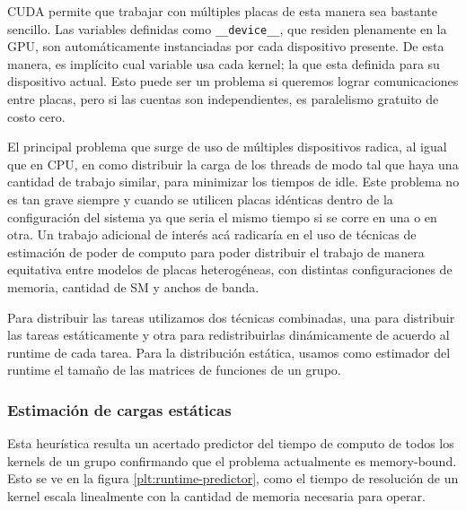 CUDA permite que trabajar con m\'ultiples placas de esta manera sea bastante sencillo. Las variables
definidas como \texttt{\_\_device\_\_}, que residen plenamente en la GPU, son autom\'aticamente instanciadas
por cada dispositivo presente. De esta manera, es impl\'icito cual variable usa cada kernel; la que
esta definida para su dispositivo actual. Esto puede ser un problema si queremos lograr comunicaciones entre placas,
pero si las cuentas son independientes, es paralelismo gratuito de costo cero.

El principal problema que surge de uso de m\'ultiples dispositivos radica, al igual que en
CPU, en como distribuir la carga de los threads de modo tal que haya una cantidad de trabajo
similar, para minimizar los tiempos de idle. Este problema no es tan grave siempre y cuando
se utilicen placas id\'enticas dentro de la configuraci\'on del sistema ya que seria
el mismo tiempo si se corre en una o en otra. Un trabajo adicional de inter\'es ac\'a
radicar\'ia en el uso de t\'ecnicas de estimaci\'on de poder de computo para poder
distribuir el trabajo de manera equitativa entre modelos de placas heterog\'eneas, con distintas
configuraciones de memoria, cantidad de SM y anchos de banda.

Para distribuir las tareas utilizamos dos t\'ecnicas combinadas, una para distribuir las
tareas est\'aticamente y otra para redistribuirlas din\'amicamente de acuerdo al runtime de
cada tarea. Para la distribuci\'on est\'atica, usamos como estimador del runtime el tama\~no
de las matrices de funciones de un grupo.


\subsubsection{Estimaci\'on de cargas est\'aticas}
Esta heur\'istica resulta un acertado predictor del tiempo de computo de todos los
kernels de un grupo confirmando que el problema actualmente es memory-bound. Esto se ve en la figura
\ref{plt:runtime-predictor}, como el tiempo de resoluci\'on de un kernel escala linealmente con
la cantidad de memoria necesaria para operar.

